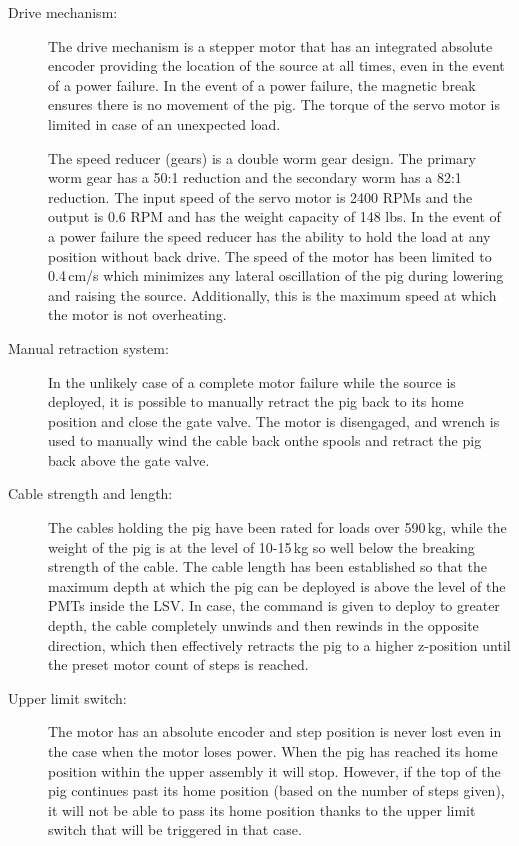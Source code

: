 \begin{description}

\item[Drive mechanism:]
The drive mechanism is a stepper motor that has an integrated absolute encoder providing the location of the source at all times, even in the event of a power failure. In the event of a power failure, the magnetic break ensures there is no movement of the pig. The torque of the servo motor is limited in case of an unexpected load. 

The speed reducer (gears) is a double worm gear design. The primary worm gear has a 50:1 reduction and the secondary worm has a 82:1 reduction. The input speed of the servo motor is 2400 RPMs and the output is 0.6 RPM and has the weight capacity of 148 lbs. In the event of a power failure the speed reducer has the ability to hold the load at any position without back drive. The speed of the motor has been limited to 0.4\,cm/s which minimizes any lateral oscillation of the pig during lowering and raising the source. Additionally, this is the maximum speed at which the motor is not overheating.

\item[Manual retraction system:]
In the unlikely case of a complete motor failure while the source is deployed, it is possible to manually retract the pig back to its home position and close the gate valve. The motor is disengaged, and wrench is used to manually wind the cable back onthe spools and retract the pig back above the gate valve. 

\item[Cable strength and length:]
The cables holding the pig have been rated for loads over 590\,kg, while the weight of the pig is at the level of 10-15\,kg so well below the breaking strength of the cable. The cable length has been established so that the maximum depth at which the pig can be deployed is above the level of the PMTs inside the LSV. In case, the command is given to deploy to greater depth, the cable completely unwinds and then rewinds in the opposite direction, which then effectively retracts the pig to a higher z-position until the preset motor count of steps is reached. 


   
\item[Upper limit switch:]
The motor has an absolute encoder and step position is never lost even in the case when the motor loses power. When the pig has reached its home position within the upper assembly it will stop.  However, if the top of the pig continues past its home position (based on the number of steps given), it will not be able to pass its home position thanks to the upper limit switch that will be triggered in that case. 


\end{description}
